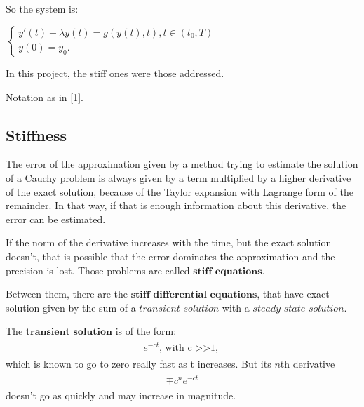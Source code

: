 \documentclass[letterpaper,10pt,english]{jupyterBook}
\begin{document}
\sphinxAtStartPar
So the system is:

\sphinxAtStartPar
\(\begin{cases}
    y'(t) + \lambda y(t) = g(y(t), t), t \in (t_0, T) \\
    y(0) = y_0 
    \text{.}
\end{cases}\)

\sphinxAtStartPar
In this project, the stiff ones were those addressed.

\sphinxAtStartPar
Notation as in {[}1{]}.


\subsection{Stiffness}
\label{\detokenize{cap1:stiffness}}
\sphinxAtStartPar
The error of the approximation given by a method trying to estimate the solution of a Cauchy problem is always given by a term multiplied by a higher derivative of the exact solution, because of the Taylor expansion with Lagrange form of the remainder. In that way, if that is enough information about this derivative, the error can be estimated.

\sphinxAtStartPar
If the norm of the derivative increases with the time, but the exact solution doesn’t, that is possible that the error dominates the approximation and the precision is lost. Those problems are called \(\textbf{stiff equations}\).

\sphinxAtStartPar
Between them, there are the \(\textbf{stiff differential equations}\), that have exact solution given by the sum of a \(\textit{transient solution}\) with a \(\textit{steady state solution}\).

\sphinxAtStartPar
The \(\textbf{transient solution}\) is of the form:
\begin{equation*}
\begin{split}
\begin{align*}
e^{-ct} \text{, with c >>1, }
\end{align*}
\end{split}
\end{equation*}
\sphinxAtStartPar
which is known to go to zero really fast as t increases. But its \(n\)th derivative
\begin{equation*}
\begin{split}
\begin{align*}
\mp c^{n}e^{-ct}
\end{align*}
\end{split}
\end{equation*}
\sphinxAtStartPar
doesn’t go as quickly and may increase in magnitude.
\end{document}

